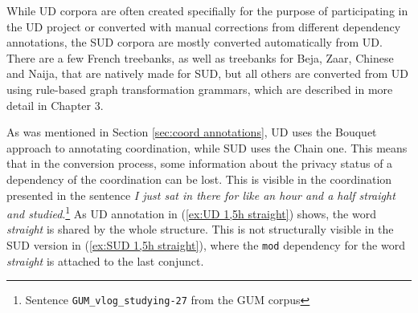 While UD corpora are often created specifially for the purpose of participating in the UD project or converted with manual corrections from different dependency annotations, the SUD corpora are mostly converted automatically from UD. There are a few French treebanks, as well as treebanks for Beja, Zaar, Chinese and Naija, that are natively made for SUD, but all others are converted from UD using rule-based graph transformation grammars, which are described in more detail in Chapter 3. 

As was mentioned in Section \ref{sec:coord annotations}, UD uses the Bouquet approach to annotating coordination, while SUD uses the Chain one. This means that in the conversion process, some information about the privacy status of a dependency of the coordination can be lost. This is visible in the coordination presented in the sentence \textsl{I just sat in there for like an hour and a half straight and studied}.\footnote{Sentence \texttt{GUM\_vlog\_studying-27} from the GUM corpus} As UD annotation in (\ref{ex:UD 1,5h straight}) shows, the word \textsl{straight} is shared by the whole structure. This is not structurally visible in the SUD version in (\ref{ex:SUD 1,5h straight}), where the \texttt{mod} dependency for the word \textsl{straight} is attached to the last conjunct. 

